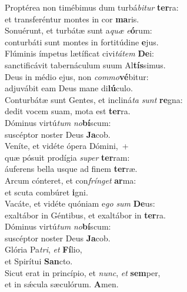 \evenverse Proptérea non timébimus dum turbá\textit{bi}\textit{tur} \textbf{ter}ra:~\*\\
\evenverse et transferéntur montes in cor \textbf{ma}ris.\\
\oddverse Sonuérunt, et turbátæ sunt a\textit{quæ} \textit{e}\textbf{ó}rum:~\*\\
\oddverse conturbáti sunt montes in fortitúdine \textbf{e}jus.\\
\evenverse Flúminis ímpetus lætíficat civi\textit{tá}\textit{tem} \textbf{De}i:~\*\\
\evenverse sanctificávit tabernáculum suum Al\textbf{tís}simus.\\
\oddverse Deus in médio ejus, non \textit{com}\textit{mo}\textbf{vé}bitur:~\*\\
\oddverse adjuvábit eam Deus mane di\textbf{lú}culo.\\
\evenverse Conturbátæ sunt Gentes, et incliná\textit{ta} \textit{sunt} \textbf{re}gna:~\*\\
\evenverse dedit vocem suam, mota est \textbf{ter}ra.\\
\oddverse Dóminus virtú\textit{tum} \textit{no}\textbf{bí}scum:~\*\\
\oddverse suscéptor noster Deus \textbf{Ja}cob.\\
\evenverse Veníte, et vidéte ópera Dómini,~+\\
\evenverse  quæ pósuit prodígia \textit{su}\textit{per} \textbf{ter}ram:~\*\\
\evenverse áuferens bella usque ad finem \textbf{ter}ræ.\\
\oddverse Arcum cónteret, et con\textit{frín}\textit{get} \textbf{ar}ma:~\*\\
\oddverse et scuta combúret \textbf{i}gni.\\
\evenverse Vacáte, et vidéte quóniam e\textit{go} \textit{sum} \textbf{De}us:~\*\\
\evenverse exaltábor in Géntibus, et exaltábor in \textbf{ter}ra.\\
\oddverse Dóminus virtú\textit{tum} \textit{no}\textbf{bí}scum:~\*\\
\oddverse suscéptor noster Deus \textbf{Ja}cob.\\
\evenverse Glória Pa\textit{tri}, \textit{et} \textbf{Fí}lio,~\*\\
\evenverse et Spirítui \textbf{San}cto.\\
\oddverse Sicut erat in princípio, et \textit{nunc}, \textit{et} \textbf{sem}per,~\*\\
\oddverse et in sǽcula sæculórum. \textbf{A}men.\\
